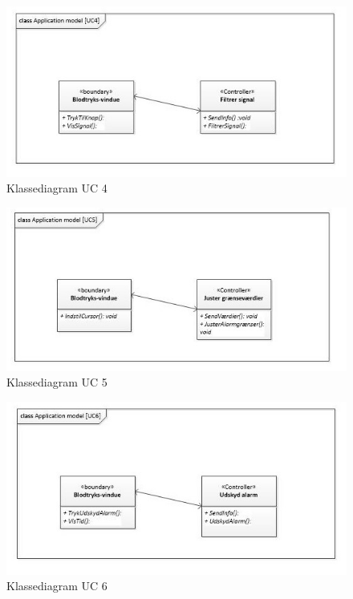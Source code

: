 \begin{figure}[H]
	\includegraphics[width=1\textwidth]{Figurer/classAppModelUC4}
	\caption{Klassediagram UC 4}
	\label{classApp UC4}
\end{figure}

\begin{figure}[H]
	\includegraphics[width=1\textwidth]{Figurer/classAppModelUC5}
	\caption{Klassediagram UC 5}
	\label{classApp UC5}
\end{figure}

\begin{figure}[H]
	\includegraphics[width=1\textwidth]{Figurer/classAppModelUC6}
	\caption{Klassediagram UC 6}
	\label{classApp UC6}
\end{figure}

